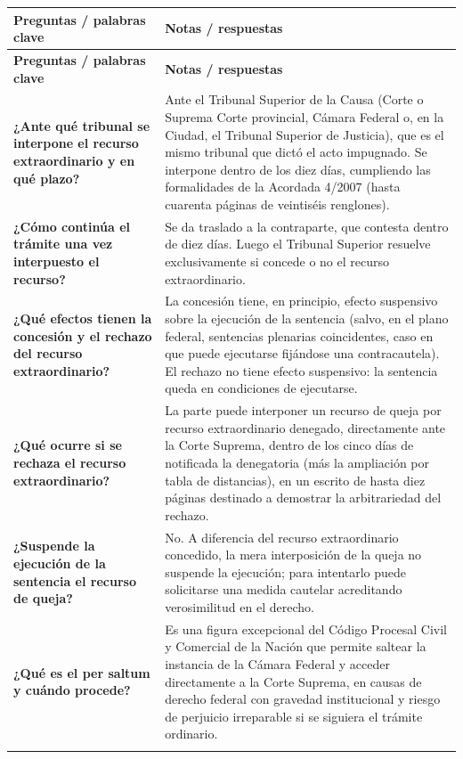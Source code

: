 \documentclass[12pt,oneside]{book}
\newlength{\cornellleft}
\newlength{\cornellright}
\newcommand{\cornellheader}{%
    \toprule
    \rowcolor{blue!8}
    \textbf{Preguntas / palabras clave} & \textbf{Notas / respuestas} \\
    \midrule
}
\newcommand{\cornellsep}{%
    \arrayrulecolor{gray!50}\midrule[0.3pt]\arrayrulecolor{black}%
}
\begin{document}
\begin{longtable}{
    >{\raggedright\arraybackslash}p{\cornellleft}
    >{\raggedright\arraybackslash}p{\cornellright}
}
\cornellheader
\endfirsthead
\cornellheader
\endhead

\textbf{¿Ante qué tribunal se interpone el recurso extraordinario y en qué plazo?} &
Ante el Tribunal Superior de la Causa (Corte o Suprema Corte provincial, Cámara Federal o, en la Ciudad, el Tribunal Superior de Justicia), que es el mismo tribunal que dictó el acto impugnado. Se interpone dentro de los diez días, cumpliendo las formalidades de la Acordada 4/2007 (hasta cuarenta páginas de veintiséis renglones). \\
\cornellsep

\textbf{¿Cómo continúa el trámite una vez interpuesto el recurso?} &
Se da traslado a la contraparte, que contesta dentro de diez días. Luego el Tribunal Superior resuelve exclusivamente si concede o no el recurso extraordinario. \\
\cornellsep

\textbf{¿Qué efectos tienen la concesión y el rechazo del recurso extraordinario?} &
La concesión tiene, en principio, efecto suspensivo sobre la ejecución de la sentencia (salvo, en el plano federal, sentencias plenarias coincidentes, caso en que puede ejecutarse fijándose una contracautela). El rechazo no tiene efecto suspensivo: la sentencia queda en condiciones de ejecutarse. \\
\cornellsep

\textbf{¿Qué ocurre si se rechaza el recurso extraordinario?} &
La parte puede interponer un recurso de queja por recurso extraordinario denegado, directamente ante la Corte Suprema, dentro de los cinco días de notificada la denegatoria (más la ampliación por tabla de distancias), en un escrito de hasta diez páginas destinado a demostrar la arbitrariedad del rechazo. \\
\cornellsep

\textbf{¿Suspende la ejecución de la sentencia el recurso de queja?} &
No. A diferencia del recurso extraordinario concedido, la mera interposición de la queja no suspende la ejecución; para intentarlo puede solicitarse una medida cautelar acreditando verosimilitud en el derecho. \\
\cornellsep

\textbf{¿Qué es el per saltum y cuándo procede?} &
Es una figura excepcional del Código Procesal Civil y Comercial de la Nación que permite saltear la instancia de la Cámara Federal y acceder directamente a la Corte Suprema, en causas de derecho federal con gravedad institucional y riesgo de perjuicio irreparable si se siguiera el trámite ordinario. \\
\cornellsep


\end{longtable}
\end{document}

